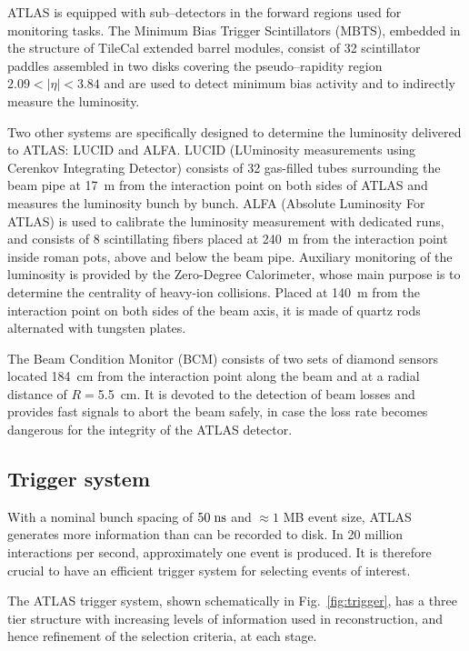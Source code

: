 ATLAS is equipped with sub--detectors in the forward regions used for
monitoring tasks.
The Minimum Bias Trigger Scintillators (MBTS), embedded in the
structure of TileCal extended barrel modules, consist of 32 scintillator
paddles assembled in two disks covering the pseudo--rapidity region
$2.09<|\eta|<3.84$ and are used to detect minimum bias activity and to
indirectly measure the luminosity.

Two other systems are specifically designed to determine the
luminosity delivered to ATLAS: LUCID and ALFA.
LUCID (LUminosity measurements using Cerenkov Integrating Detector)
consists of 32 gas-filled tubes surrounding the beam pipe at 17~m from
the interaction point on both sides of ATLAS and measures the
luminosity bunch by bunch. 
ALFA (Absolute Luminosity For ATLAS) is used to calibrate the
luminosity measurement with dedicated runs, and consists of 8
scintillating fibers placed at 240~m from the interaction point inside
roman pots, above and below the beam pipe.
Auxiliary monitoring of the luminosity is provided by the Zero-Degree
Calorimeter, whose main purpose is to determine the centrality of heavy-ion
collisions.
Placed at 140~m from the interaction point on both sides of the beam axis,
it is made of quartz rods alternated with tungsten plates.

The Beam Condition Monitor (BCM) consists of two sets of
diamond sensors located 184~cm from the interaction point along the
beam and at a radial distance of $R=$5.5~cm. 
It is devoted to the detection of beam losses and provides fast
signals to abort the beam safely, in case the loss rate becomes dangerous
for the integrity of the ATLAS detector.

\subsection{Trigger system}
\label{sec:triggerDAQ}

With a nominal bunch spacing of \mbox{$50 \; \mathrm{ns}$} and
$\approx{}1$ MB event size, ATLAS generates more
information than can be recorded to disk. In 20 million 
interactions per second, approximately one \ttbar{} event 
is produced. It is therefore crucial to have an efficient trigger
system for selecting events of interest.

The ATLAS trigger system, shown schematically in
Fig.~\ref{fig:trigger}, has a three tier structure with increasing
levels of information used in reconstruction, and hence refinement of
the selection criteria, at each stage.

